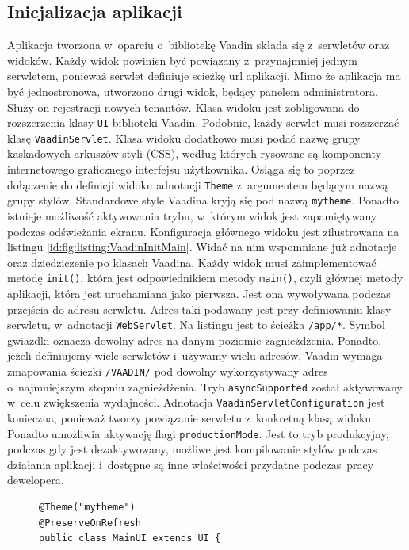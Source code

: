 \documentclass[a4paper]{book}
\begin{document}
{\subsection{Inicjalizacja aplikacji}
Aplikacja tworzona w~oparciu o~bibliotekę Vaadin składa się z~serwletów oraz widoków. Każdy widok powinien być powiązany z~przynajmniej jednym serwletem, ponieważ serwlet definiuje scieżkę url aplikacji. Mimo że aplikacja ma być jednostronowa, utworzono drugi widok, będący panelem administratora. Służy on rejestracji nowych tenantów. Klasa widoku jest zobligowana do rozszerzenia klasy \lstinline|UI| biblioteki Vaadin. Podobnie, każdy serwlet musi rozszerzać klasę \lstinline|VaadinServlet|. Klasa widoku dodatkowo musi podać nazwę grupy kaskadowych arkuszów styli (CSS), według których rysowane są komponenty internetowego graficznego interfejsu użytkownika. Osiąga się to poprzez dołączenie do definicji widoku adnotacji \lstinline|Theme| z~argumentem będącym nazwą grupy stylów. Standardowe style Vaadina kryją się pod nazwą \lstinline|mytheme|. Ponadto istnieje możliwość aktywowania trybu, w~którym widok jest zapamiętywany podczas odświeżania ekranu. Konfiguracja głównego widoku jest zilustrowana na listingu \ref{id:fig:listing:VaadinInitMain}. Widać na nim wspomniane już adnotacje oraz dziedziczenie po klasach Vaadina. Każdy widok musi zaimplementować metodę \lstinline|init()|, która jest odpowiednikiem metody \lstinline|main()|, czyli głównej metody aplikacji, która jest uruchamiana jako pierwsza. Jest ona wywoływana podczas przejścia do adresu serwletu. Adres taki podawany jest przy definiowaniu klasy serwletu, w~adnotacji \lstinline|WebServlet|. Na listingu jest to ścieżka \lstinline|/app/*|. Symbol gwiazdki oznacza dowolny adres na danym poziomie zagnieżdżenia. Ponadto, jeżeli definiujemy wiele serwletów i~używamy wielu adresów, Vaadin wymaga zmapowania ścieżki \lstinline|/VAADIN/| pod dowolny wykorzystywany adres o~najmniejszym stopniu zagnieżdżenia. Tryb \lstinline|asyncSupported| został aktywowany w~celu zwiększenia wydajności. Adnotacja \lstinline|VaadinServletConfiguration| jest konieczna, ponieważ tworzy powiązanie serwletu z~konkretną klasą widoku. Ponadto umożliwia aktywację flagi \lstinline|productionMode|. Jest to tryb produkcyjny, podczas gdy jest dezaktywowany, możliwe jest kompilowanie stylów podczas działania aplikacji i~dostępne są inne właściwości przydatne podczas~pracy dewelopera.
\begin{figure}
\begin{lstlisting}
@Theme("mytheme")
@PreserveOnRefresh
public class MainUI extends UI {


\end{lstlisting}
\end{figure}}
\end{document}
